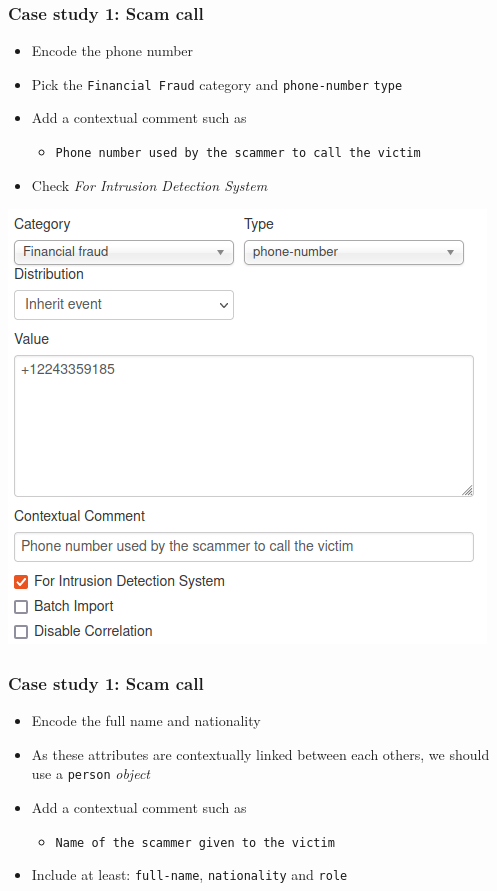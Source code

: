 \begin{frame}
    \frametitle{Case study 1: Scam call}
    \begin{itemize}
        \item Encode the phone number
        \item Pick the \texttt{Financial Fraud} category and \texttt{phone-number} \texttt{type}
        \item Add a contextual comment such as
        \begin{itemize}
            \item \texttt{Phone number used by the scammer to call the victim}
        \end{itemize}
        \item Check \textit{For Intrusion Detection System}
    \end{itemize}
    \begin{center}
        \includegraphics[width=0.70\linewidth]{pictures/case1/attribute-phone.png}
    \end{center}
\end{frame}

\begin{frame}
    \frametitle{Case study 1: Scam call}
    \begin{itemize}
        \item Encode the full name and nationality
        \item As these attributes are contextually linked between each others, we should use a \texttt{person} \textit{object}
        \item Add a contextual comment such as
        \begin{itemize}
            \item \texttt{Name of the scammer given to the victim}
        \end{itemize}
        \item Include at least: \texttt{full-name}, \texttt{nationality} and \texttt{role}
    \end{itemize}
\end{frame}


